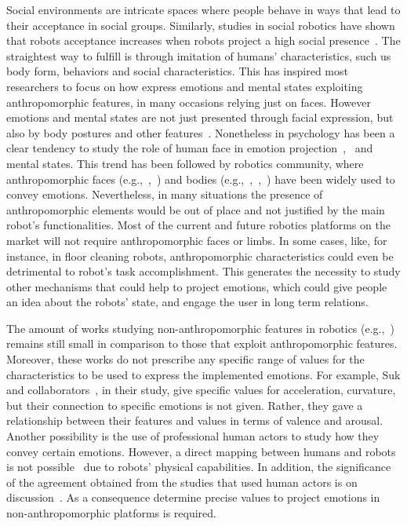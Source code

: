 Social environments are intricate spaces where people behave in ways that lead to their acceptance in social groups. Similarly, studies in social robotics have shown that robots acceptance increases when robots project a high social presence~\cite{Heerink08}. The straightest way to fulfill is through imitation of humans' characteristics, such us body form, behaviors and social characteristics. This has inspired most researchers to focus on how express emotions and mental states exploiting anthropomorphic features, in many occasions relying just on faces. However emotions and mental states are not just presented through facial expression, but also by body postures and other features~\cite{Gelder2008}. Nonetheless in psychology has been a clear tendency to study the role of human face in emotion projection~\cite{Ekman2004},~\cite{kleinsmith2012affective} and mental states. This trend has been followed by robotics community, where anthropomorphic faces (e.g.,~\cite{Arras2012},~\cite{Breazeal2002}) and bodies (e.g.,~\cite{Canamero2010},~\cite{haering2011},~\cite{Destephe2013}) have been widely used to convey emotions.
Nevertheless, in many situations the presence of anthropomorphic elements would be out of place and not justified by the main robot's functionalities. Most of the current and future robotics platforms on the market will not require anthropomorphic faces or limbs. In some cases, like, for instance, in floor cleaning robots, anthropomorphic characteristics could even be detrimental to robot's task accomplishment.
This generates the necessity to study other mechanisms that could help to project emotions, which could give people an idea about the robots' state, and engage the user in long term relations.

The amount of works studying non-anthropomorphic features in robotics (e.g.,~\cite{Saerbeck2010,Lakatos2014,Sharma2013,Novika2015}) remains still small in comparison to those that exploit anthropomorphic features. Moreover, these works do not prescribe any specific range of values for the characteristics to be used to express the  implemented emotions. For example, Suk and collaborators~\cite{NAM2014}, in their study, give specific values for acceleration, curvature, but their connection to specific emotions is not given. Rather, they gave a relationship between their features and values in terms of valence and arousal. Another possibility is the use of professional human actors to study how they convey certain emotions. However, a direct mapping between humans and robots is not possible~\cite{Saerbeck2007,Canamero2010} due to robots' physical capabilities. In addition, the significance of the agreement obtained from the studies that used human actors is on discussion~\cite{Russell2003}. As a consequence determine precise values to project emotions in non-anthropomorphic platforms is required.
 

